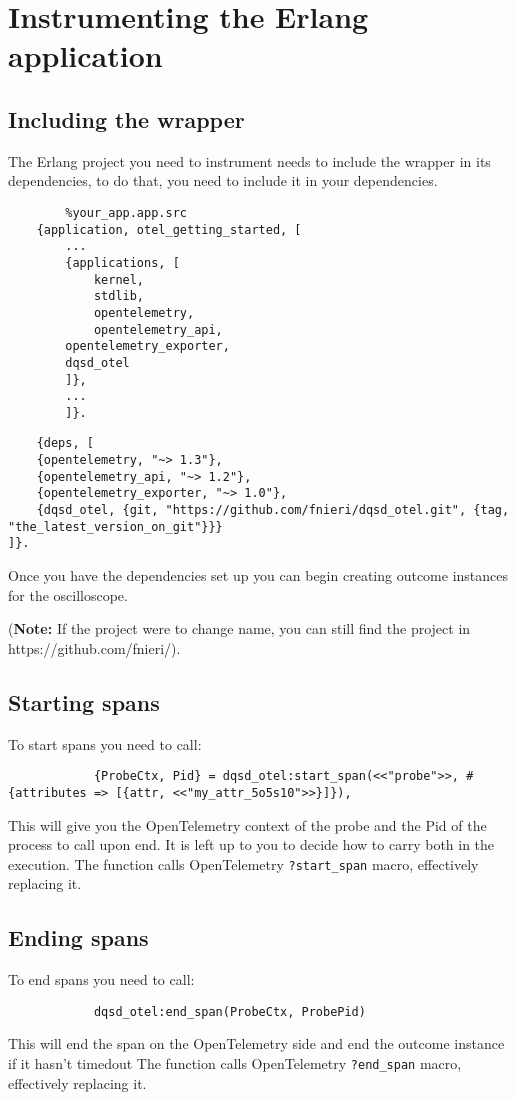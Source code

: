 \section{Instrumenting the Erlang application}
    \subsection{Including the wrapper}

    The Erlang project you need to instrument needs to include the wrapper in its dependencies, to do that, you need to include it in your dependencies.

    \begin{verbatim}
        %your_app.app.src
    {application, otel_getting_started, [
        ...
        {applications, [
            kernel,
            stdlib,
            opentelemetry,
            opentelemetry_api,
        opentelemetry_exporter,
        dqsd_otel
        ]},
        ...
        ]}.
    \end{verbatim}

    \begin{verbatim}
    {deps, [
    {opentelemetry, "~> 1.3"},
    {opentelemetry_api, "~> 1.2"},
    {opentelemetry_exporter, "~> 1.0"},
    {dqsd_otel, {git, "https://github.com/fnieri/dqsd_otel.git", {tag, "the_latest_version_on_git"}}}
]}.
    \end{verbatim}
    
    Once you have the dependencies set up you can begin creating outcome instances for the oscilloscope.

    (\textbf{Note:} If the project were to change name, you can still find the project in https://github.com/fnieri/).

    \subsection{Starting spans}
        To start spans you need to call:
        \begin{verbatim}
            {ProbeCtx, Pid} = dqsd_otel:start_span(<<"probe">>, #{attributes => [{attr, <<"my_attr_5o5s10">>}]}),
        \end{verbatim}
        This will give you the OpenTelemetry context of the probe and the Pid of the process to call upon end. It is left up to you to decide how to carry both in the execution.
        The function calls OpenTelemetry \texttt{?start\_span} macro, effectively replacing it.

    \subsection{Ending spans}
        To end spans you need to call:
        \begin{verbatim}
            dqsd_otel:end_span(ProbeCtx, ProbePid)
        \end{verbatim}
        This will end the span on the OpenTelemetry side and end the outcome instance if it hasn't timedout
        The function calls OpenTelemetry \texttt{?end\_span} macro, effectively replacing it.

